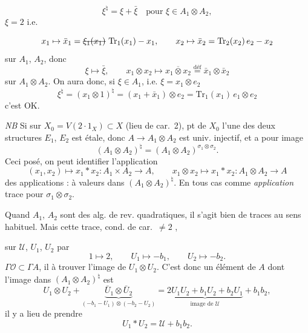 \documentclass[11pt,a4paper]{article}
\begin{document}

\[
  \xi^{\natural} = \xi + \bar{\xi} \quad \text{pour } \xi \in A_1 \otimes A_2 ,
\]
\ill{} \ill{} \ill{} $\xi = 2$ i.e. \ill{}

\[
  x_1 \mapsto \bar{x}_1 = \text{\struck{$\xi_1(x_1)$}}\ \mathrm{Tr}_1(x_1) - x_1 ,
  \qquad
  x_2 \mapsto \bar{x}_2 = \mathrm{Tr}_2(x_2)\, e_2 - x_2
\]
sur $A_1$, $A_2$, donc
\[
  \xi \mapsto \bar{\xi} , \qquad
  x_1 \otimes x_2 \mapsto \overline{x_1 \otimes x_2} \overset{\mathrm{déf}}{=} \bar{x}_1 \otimes \bar{x}_2
\]
sur $A_1 \otimes A_2$. On aura donc, si $\xi \in A_1$, i.e.
$\xi = x_1 \otimes e_2$
\[
  \xi^{\natural} = (x_1 \otimes 1)^{\natural} = (x_1 + \bar{x}_1) \otimes e_2 = \mathrm{Tr}_1(x_1)\, e_1 \otimes e_2
\]
c'est OK.

\emph{NB} Si \struck{\ill{}} sur $X_0 = V(2 \cdot 1_X) \subset X$ (lieu de car.~2), \struck{\ill{}}  pt de $X_0$ l'une des deux structures $E_1$, $E_2$ est étale, donc $A \to A_1 \otimes A_2$ est univ. injectif, et a pour image
\[
  (A_1 \otimes A_2)^{\natural} = (A_1 \otimes A_2)^{\sigma_1 \otimes \sigma_2} .
\]
Ceci posé, on peut  identifier l'application
\[
  (x_1, x_2) \mapsto x_1 * x_2 : A_1 \times A_2 \to A , \qquad
  x_1 \otimes x_2 \mapsto x_1 * x_2 : A_1 \otimes A_2 \to A
\]
\ill{} \ill{} des applications : à valeurs dans $(A_1 \otimes A_2)^{\natural}$. En tous cas \ill{} \ill{} \ill{}  \struck{\ill{}} comme \emph{application} trace pour $\sigma_1 \otimes \sigma_2$.

Quand $A_1$, $A_2$ sont des alg. de rev. quadratiques, il s'agit bien de traces au sens habituel. Mais cette trace,  cond. de car.~$\neq 2$ ,

 \struck{\ill{}} sur $\mathcal{U}$, $U_1$, $U_2$ par
\[
  1 \mapsto 2 , \qquad U_1 \mapsto -b_1 , \qquad U_2 \mapsto -b_2 .
\]
 \ill{} $\Gamma\mathcal{O} \subset \Gamma A$, il  à trouver l'image de $U_1 \otimes U_2$. C'est donc un élément de $A$ dont l'image dans $(A_1 \otimes A_2)^{\natural}$ est
\[
  U_1 \otimes U_2 + \underbrace{\bar{U}_1 \otimes \bar{U}_2}_{(-b_1 - U_1) \otimes (-b_2 - U_2)}
  = \underbrace{2 U_1 U_2 + b_1 U_2 + b_2 U_1}_{\text{image de } \mathcal{U}} + b_1 b_2 ,
\]
 il y a lieu de prendre
\[
  U_1 * U_2 = \mathcal{U} + b_1 b_2 .
\]
\end{document}
